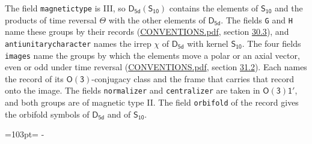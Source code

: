 \documentclass[10pt,a4paper]{article}
\newcommand{\needspace}[1]{\par\penalty-100\begingroup\dimen0=#1\relax\dimen2=\pagegoal
  \advance\dimen2-\pagetotal\ifdim\dimen0>\dimen2\relax\ifdim\dimen2>0pt\vfil\break\fi\fi
  \endgroup}
\numberwithin{equation}{section}
\newcommand{\grp}[1]{\mathsf{#1}}
\begin{document}
The field \texttt{magnetictype} is III, so $\grp{D_{5d}}(\grp{S_{10}})$ contains the elements of $\grp{S_{10}}$ and the products of time reversal $\varTheta$ with the other elements of $\grp{D_{5d}}$. The fields \texttt{G} and \texttt{H} name these groups by their records (\href{../../CONVENTIONS.pdf}{CONVENTIONS.pdf}, section \href{../../CONVENTIONS.pdf\#conv.30.3}{30.3}), and \texttt{antiunitarycharacter} names the irrep $\chi$ of $\grp{D_{5d}}$ with kernel $\grp{S_{10}}$. The four fields \texttt{images} name the groups by which the elements move a polar or an axial vector, even or odd under time reversal (\href{../../CONVENTIONS.pdf}{CONVENTIONS.pdf}, section \href{../../CONVENTIONS.pdf\#conv.31.2}{31.2}). Each names the record of its $\grp{O(3)}$-conjugacy class and the frame that carries that record onto the image. The fields \texttt{normalizer} and \texttt{centralizer} are taken in $\grp{O(3)1'}$, and both groups are of magnetic type II. The field \texttt{orbifold} of the record gives the orbifold symbols of $\grp{D_{5d}}$ and of $\grp{S_{10}}$.
\needspace{103pt}
\end{document}
